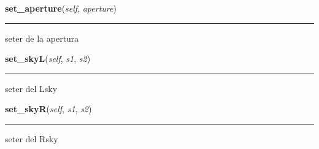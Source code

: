     \label{spectro_metria:spect:set_aperture}

    \vspace{0.5ex}

\hspace{.8\funcindent}\begin{boxedminipage}{\funcwidth}

    \raggedright \textbf{set\_aperture}(\textit{self}, \textit{aperture})

    \vspace{-1.5ex}

    \rule{\textwidth}{0.5\fboxrule}
\setlength{\parskip}{2ex}
    seter de la apertura

\setlength{\parskip}{1ex}
    \end{boxedminipage}

    \label{spectro_metria:spect:set_skyL}

    \vspace{0.5ex}

\hspace{.8\funcindent}\begin{boxedminipage}{\funcwidth}

    \raggedright \textbf{set\_skyL}(\textit{self}, \textit{s1}, \textit{s2})

    \vspace{-1.5ex}

    \rule{\textwidth}{0.5\fboxrule}
\setlength{\parskip}{2ex}
    seter del Lsky

\setlength{\parskip}{1ex}
    \end{boxedminipage}

    \label{spectro_metria:spect:set_skyR}

    \vspace{0.5ex}

\hspace{.8\funcindent}\begin{boxedminipage}{\funcwidth}

    \raggedright \textbf{set\_skyR}(\textit{self}, \textit{s1}, \textit{s2})

    \vspace{-1.5ex}

    \rule{\textwidth}{0.5\fboxrule}
\setlength{\parskip}{2ex}
    seter del Rsky

\setlength{\parskip}{1ex}
    \end{boxedminipage}

